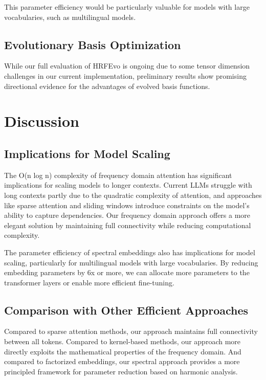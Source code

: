 \documentclass[10pt,twocolumn,letterpaper]{article}
\begin{document}
This parameter efficiency would be particularly valuable for models with large vocabularies, such as multilingual models.

\subsection{Evolutionary Basis Optimization}

While our full evaluation of HRFEvo is ongoing due to some tensor dimension challenges in our current implementation, preliminary results show promising directional evidence for the advantages of evolved basis functions.

\section{Discussion}

\subsection{Implications for Model Scaling}

The O(n log n) complexity of frequency domain attention has significant implications for scaling models to longer contexts. Current LLMs struggle with long contexts partly due to the quadratic complexity of attention, and approaches like sparse attention and sliding windows introduce constraints on the model's ability to capture dependencies. Our frequency domain approach offers a more elegant solution by maintaining full connectivity while reducing computational complexity.

The parameter efficiency of spectral embeddings also has implications for model scaling, particularly for multilingual models with large vocabularies. By reducing embedding parameters by 6x or more, we can allocate more parameters to the transformer layers or enable more efficient fine-tuning.

\subsection{Comparison with Other Efficient Approaches}

Compared to sparse attention methods, our approach maintains full connectivity between all tokens. Compared to kernel-based methods, our approach more directly exploits the mathematical properties of the frequency domain. And compared to factorized embeddings, our spectral approach provides a more principled framework for parameter reduction based on harmonic analysis.
\end{document}
